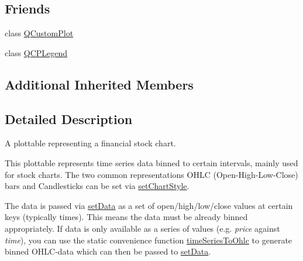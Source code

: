 \subsection*{Friends}
\begin{DoxyCompactItemize}
\item 
class \hyperlink{class_q_c_p_financial_a1cdf9df76adcfae45261690aa0ca2198}{Q\+Custom\+Plot}
\item 
class \hyperlink{class_q_c_p_financial_a8429035e7adfbd7f05805a6530ad5e3b}{Q\+C\+P\+Legend}
\end{DoxyCompactItemize}
\subsection*{Additional Inherited Members}


\subsection{Detailed Description}
A plottable representing a financial stock chart. 



This plottable represents time series data binned to certain intervals, mainly used for stock charts. The two common representations O\+H\+LC (Open-\/\+High-\/\+Low-\/\+Close) bars and Candlesticks can be set via \hyperlink{class_q_c_p_financial_a5a59175d36279d71596e64d7bb65596f}{set\+Chart\+Style}.

The data is passed via \hyperlink{class_q_c_p_financial_a72089e75b8a50d18097526c3c79fdb85}{set\+Data} as a set of open/high/low/close values at certain keys (typically times). This means the data must be already binned appropriately. If data is only available as a series of values (e.\+g. {\itshape price} against {\itshape time}), you can use the static convenience function \hyperlink{class_q_c_p_financial_a9a058c035040d3939b8884f4aaccb1a7}{time\+Series\+To\+Ohlc} to generate binned O\+H\+L\+C-\/data which can then be passed to \hyperlink{class_q_c_p_financial_a72089e75b8a50d18097526c3c79fdb85}{set\+Data}.

